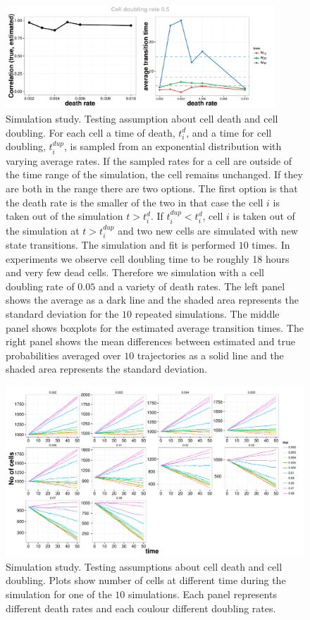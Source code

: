 \begin{figure}[b]
  \centering
  \includegraphics[width=0.9\textwidth]{pics/realist-dupl.pdf}
  \caption{Simulation study. Testing assumption about cell death and cell doubling. For each cell a time of death, $t_i^{d}$, and a time for cell doubling, $t_i^{dup}$, is sampled from an exponential distribution with varying average rates. If the sampled rates for a cell are outside of the time range of the simulation, the cell remains unchanged. If they are both in the range there are two options. The first option is that the death rate is the smaller of the two in that case the cell $i$ is taken out of the simulation $t>t_i^d$. If $t_i^{dup}<t_i^d$, cell $i$ is taken out of the simulation at $t > t_i^{dup}$ and two new cells are simulated with new state transitions. The simulation and fit is performed $10$ times.  In experiments we observe cell doubling time to be roughly 18 hours and very few dead cells. Therefore we simulation with a cell doubling rate of $0.05$ and a variety of death rates. The left panel shows the average as a dark line and the shaded area represents the standard deviation for the $10$ repeated simulations. The middle panel shows boxplots for the estimated average transition times. The right panel shows the mean differences between estimated and true probabilities averaged over $10$ trajectories as a solid line and the shaded area represents the standard deviation.}
  \label{fig:dupl-realistic}
\end{figure}


  \begin{figure}[h]
    \centering \includegraphics[width=1\textwidth]{pics/n-cell.pdf}
    \caption{Simulation study. Testing assumptions about cell death and cell doubling. Plots show number of cells at different time during the simulation for one of the $10$ simulations. Each panel represents different death rates and each coulour different doubling rates.}
\label{fig:no-cells-dupl}
\end{figure}

